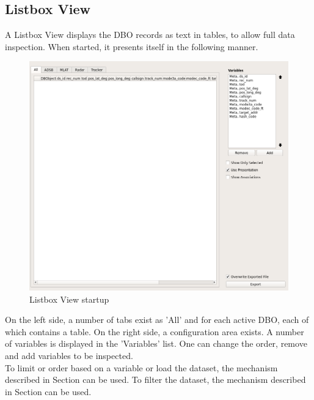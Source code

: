 \subsection{Listbox View}
\label{sec:listbox_view}
A Listbox View displays the DBO records as text in tables, to allow full data inspection. When started, it presents itself in the following manner.

\begin{figure}[H]
    \hspace*{-2cm}
    \includegraphics[width=18cm,frame]{../screenshots/listbox_start.png}
  \caption{Listbox View startup}
  \label{fig:listbox_start}
\end{figure}

On the left side, a number of tabs exist as 'All' and for each active DBO, each of which contains a table. On the right side, a configuration area exists. A number of variables is displayed in the 'Variables' list. One can change the order, remove and add variables to be inspected. \\

To limit or order based on a variable or load the dataset, the mechanism described in Section  can be used. To filter the dataset, the mechanism described in Section  can be used.

